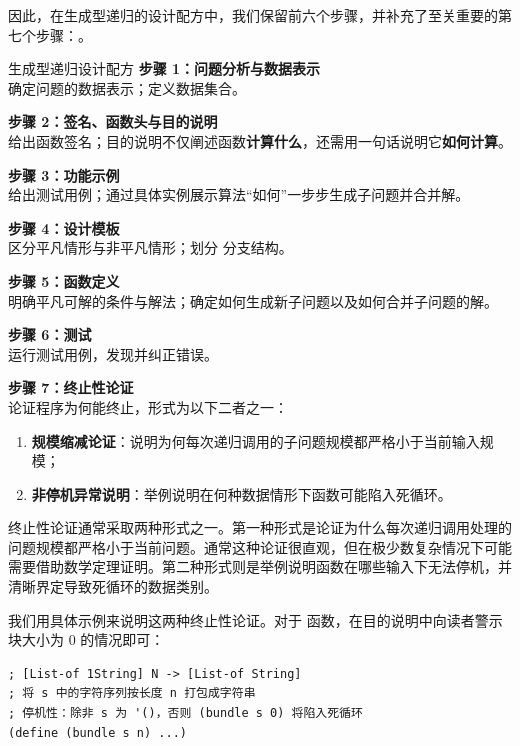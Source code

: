 因此，在生成型递归的设计配方中，我们保留前六个步骤，并补充了至关重要的第七个步骤：。

\begin{recipebox}{生成型递归设计配方}
\textbf{步骤 1：问题分析与数据表示} \\
确定问题的数据表示；定义数据集合。

\textbf{步骤 2：签名、函数头与目的说明} \\
给出函数签名；目的说明不仅阐述函数\textbf{计算什么}，还需用一句话说明它\textbf{如何计算}。

\textbf{步骤 3：功能示例} \\
给出测试用例；通过具体实例展示算法“如何”一步步生成子问题并合并解。

\textbf{步骤 4：设计模板} \\
区分平凡情形与非平凡情形；划分  分支结构。

\textbf{步骤 5：函数定义} \\
明确平凡可解的条件与解法；确定如何生成新子问题以及如何合并子问题的解。

\textbf{步骤 6：测试} \\
运行测试用例，发现并纠正错误。

\textbf{步骤 7：终止性论证} \\
论证程序为何能终止，形式为以下二者之一：
\begin{enumerate}
  \item \textbf{规模缩减论证}：说明为何每次递归调用的子问题规模都严格小于当前输入规模；
  \item \textbf{非停机异常说明}：举例说明在何种数据情形下函数可能陷入死循环。
\end{enumerate}
\end{recipebox}

终止性论证通常采取两种形式之一。第一种形式是论证为什么每次递归调用处理的问题规模都严格小于当前问题。通常这种论证很直观，但在极少数复杂情况下可能需要借助数学定理证明。第二种形式则是举例说明函数在哪些输入下无法停机，并清晰界定导致死循环的数据类别。

我们用具体示例来说明这两种终止性论证。对于  函数，在目的说明中向读者警示块大小为 0 的情况即可：

\begin{lstlisting}[language=BSL]
; [List-of 1String] N -> [List-of String]
; 将 s 中的字符序列按长度 n 打包成字符串
; 停机性：除非 s 为 '()，否则 (bundle s 0) 将陷入死循环
(define (bundle s n) ...)
\end{lstlisting}

